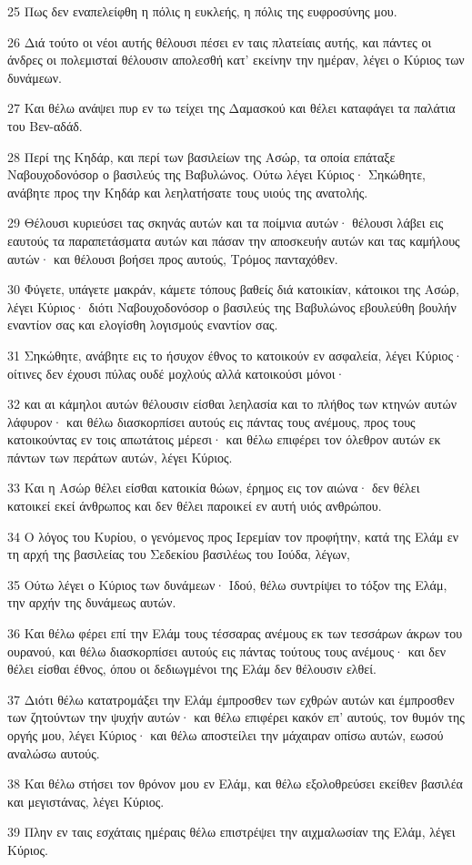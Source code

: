 \par 25 Πως δεν εναπελείφθη η πόλις η ευκλεής, η πόλις της ευφροσύνης μου.
\par 26 Διά τούτο οι νέοι αυτής θέλουσι πέσει εν ταις πλατείαις αυτής, και πάντες οι άνδρες οι πολεμισταί θέλουσιν απολεσθή κατ' εκείνην την ημέραν, λέγει ο Κύριος των δυνάμεων.
\par 27 Και θέλω ανάψει πυρ εν τω τείχει της Δαμασκού και θέλει καταφάγει τα παλάτια του Βεν-αδάδ.
\par 28 Περί της Κηδάρ, και περί των βασιλείων της Ασώρ, τα οποία επάταξε Ναβουχοδονόσορ ο βασιλεύς της Βαβυλώνος. Ούτω λέγει Κύριος· Σηκώθητε, ανάβητε προς την Κηδάρ και λεηλατήσατε τους υιούς της ανατολής.
\par 29 Θέλουσι κυριεύσει τας σκηνάς αυτών και τα ποίμνια αυτών· θέλουσι λάβει εις εαυτούς τα παραπετάσματα αυτών και πάσαν την αποσκευήν αυτών και τας καμήλους αυτών· και θέλουσι βοήσει προς αυτούς, Τρόμος πανταχόθεν.
\par 30 Φύγετε, υπάγετε μακράν, κάμετε τόπους βαθείς διά κατοικίαν, κάτοικοι της Ασώρ, λέγει Κύριος· διότι Ναβουχοδονόσορ ο βασιλεύς της Βαβυλώνος εβουλεύθη βουλήν εναντίον σας και ελογίσθη λογισμούς εναντίον σας.
\par 31 Σηκώθητε, ανάβητε εις το ήσυχον έθνος το κατοικούν εν ασφαλεία, λέγει Κύριος· οίτινες δεν έχουσι πύλας ουδέ μοχλούς αλλά κατοικούσι μόνοι·
\par 32 και αι κάμηλοι αυτών θέλουσιν είσθαι λεηλασία και το πλήθος των κτηνών αυτών λάφυρον· και θέλω διασκορπίσει αυτούς εις πάντας τους ανέμους, προς τους κατοικούντας εν τοις απωτάτοις μέρεσι· και θέλω επιφέρει τον όλεθρον αυτών εκ πάντων των περάτων αυτών, λέγει Κύριος.
\par 33 Και η Ασώρ θέλει είσθαι κατοικία θώων, έρημος εις τον αιώνα· δεν θέλει κατοικεί εκεί άνθρωπος και δεν θέλει παροικεί εν αυτή υιός ανθρώπου.
\par 34 Ο λόγος του Κυρίου, ο γενόμενος προς Ιερεμίαν τον προφήτην, κατά της Ελάμ εν τη αρχή της βασιλείας του Σεδεκίου βασιλέως του Ιούδα, λέγων,
\par 35 Ούτω λέγει ο Κύριος των δυνάμεων· Ιδού, θέλω συντρίψει το τόξον της Ελάμ, την αρχήν της δυνάμεως αυτών.
\par 36 Και θέλω φέρει επί την Ελάμ τους τέσσαρας ανέμους εκ των τεσσάρων άκρων του ουρανού, και θέλω διασκορπίσει αυτούς εις πάντας τούτους τους ανέμους· και δεν θέλει είσθαι έθνος, όπου οι δεδιωγμένοι της Ελάμ δεν θέλουσιν ελθεί.
\par 37 Διότι θέλω κατατρομάξει την Ελάμ έμπροσθεν των εχθρών αυτών και έμπροσθεν των ζητούντων την ψυχήν αυτών· και θέλω επιφέρει κακόν επ' αυτούς, τον θυμόν της οργής μου, λέγει Κύριος· και θέλω αποστείλει την μάχαιραν οπίσω αυτών, εωσού αναλώσω αυτούς.
\par 38 Και θέλω στήσει τον θρόνον μου εν Ελάμ, και θέλω εξολοθρεύσει εκείθεν βασιλέα και μεγιστάνας, λέγει Κύριος.
\par 39 Πλην εν ταις εσχάταις ημέραις θέλω επιστρέψει την αιχμαλωσίαν της Ελάμ, λέγει Κύριος.

